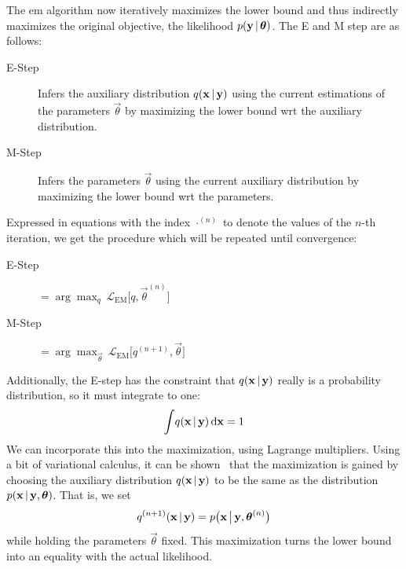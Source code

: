 	The \ac{em} algorithm now iteratively maximizes the lower bound and thus indirectly maximizes the original objective, the likelihood \( p(\boldsymbol{\mathrm{y}} \,\vert\, \boldsymbol{\mathrm{\theta}}) \). The E and M step are as follows:
	\begin{description}
		\item[E-Step] Infers the auxiliary distribution \( q(\boldsymbol{\mathrm{x}} \,\vert\, \boldsymbol{\mathrm{y}}) \) using the current estimations of the parameters \( \vec{\theta} \) by maximizing the lower bound \ac{wrt} the auxiliary distribution.
		\item[M-Step] Infers the parameters \(\vec{\theta}\) using the current auxiliary distribution by maximizing the lower bound \ac{wrt} the parameters.
	\end{description}
	Expressed in equations with the index \( \cdot^{(n)} \) to denote the values of the \(n\)-th iteration, we get the procedure which will be repeated until convergence:
	\begin{description}
		\item[E-Step]  \(\displaystyle = \arg\max_{q}\, \mathcal{L}_\mathrm{EM}\big[ q, \vec{\theta}^{(n)} \big] \)
		\item[M-Step]  \(\displaystyle = \arg\max_{\vec{\theta}}\, \mathcal{L}_\mathrm{EM}\big[ q^{(n + 1)}, \vec{\theta} \big] \)
	\end{description}
	Additionally, the E-step has the constraint that \(q(\boldsymbol{\mathrm{x}} \,\vert\, \boldsymbol{\mathrm{y}})\) really is a probability distribution, so it must integrate to one:
	\begin{align*}
		\int\! q(\boldsymbol{\mathrm{x}} \,\vert\, \boldsymbol{\mathrm{y}}) \dd{\boldsymbol{\mathrm{x}}} = 1
	\end{align*}
	We can incorporate this into the maximization, \eg using Lagrange multipliers. Using a bit of variational calculus, it can be shown~\cite{bealVariationalAlgorithmsApproximate2003a} that the maximization is gained by choosing the auxiliary distribution \(q(\boldsymbol{\mathrm{x}} \,\vert\, \boldsymbol{\mathrm{y}})\) to be the same as the distribution \( p(\boldsymbol{\mathrm{x}} \,\vert\, \boldsymbol{\mathrm{y}}, \boldsymbol{\mathrm{\theta}}) \). That is, we set
	\begin{align*}
		q^{(n + 1)}(\boldsymbol{\mathrm{x}} \,\vert\, \boldsymbol{\mathrm{y}}) = p\big(\boldsymbol{\mathrm{x}} \,\big\vert\, \boldsymbol{\mathrm{y}}, \boldsymbol{\mathrm{\theta}}^{(n)}\big)
	\end{align*}
	while holding the parameters \(\vec{\theta}\) fixed. This maximization turns the lower bound into an equality with the actual likelihood.

